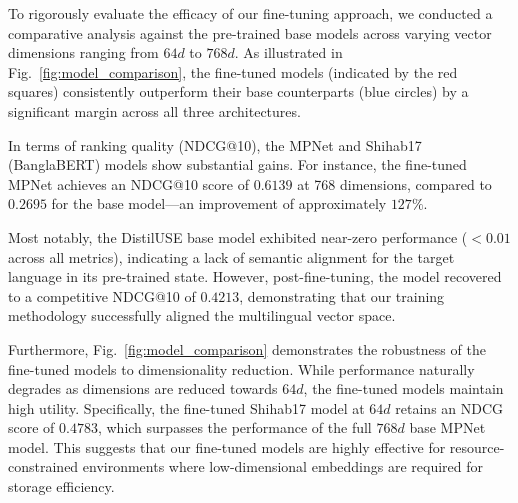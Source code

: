 \documentclass[manuscript,screen,review]{acmart}
\begin{document}
To rigorously evaluate the efficacy of our fine-tuning approach, we conducted a comparative analysis against the pre-trained base models across varying vector dimensions ranging from $64d$ to $768d$. As illustrated in Fig.~\ref{fig:model_comparison}, the fine-tuned models (indicated by the red squares) consistently outperform their base counterparts (blue circles) by a significant margin across all three architectures.

In terms of ranking quality (NDCG@10), the MPNet and Shihab17 (BanglaBERT) models show substantial gains. For instance, the fine-tuned MPNet achieves an NDCG@10 score of $0.6139$ at 768 dimensions, compared to $0.2695$ for the base model—an improvement of approximately $127\%$. 

Most notably, the DistilUSE base model exhibited near-zero performance ($<0.01$ across all metrics), indicating a lack of semantic alignment for the target language in its pre-trained state. However, post-fine-tuning, the model recovered to a competitive NDCG@10 of $0.4213$, demonstrating that our training methodology successfully aligned the multilingual vector space.

Furthermore, Fig.~\ref{fig:model_comparison} demonstrates the robustness of the fine-tuned models to dimensionality reduction. While performance naturally degrades as dimensions are reduced towards $64d$, the fine-tuned models maintain high utility. Specifically, the fine-tuned Shihab17 model at $64d$ retains an NDCG score of $0.4783$, which surpasses the performance of the full $768d$ base MPNet model. This suggests that our fine-tuned models are highly effective for resource-constrained environments where low-dimensional embeddings are required for storage efficiency.
\end{document}
